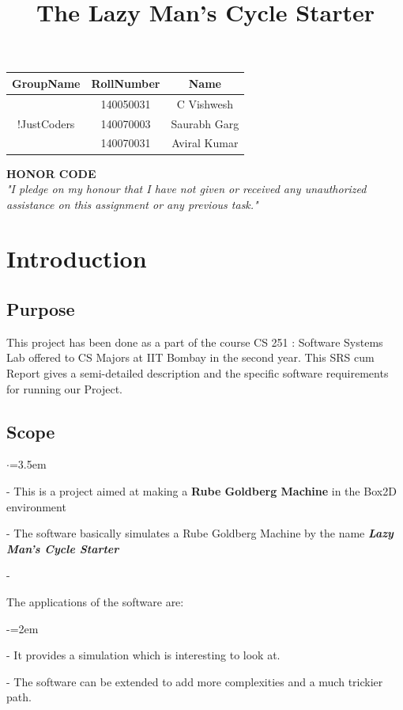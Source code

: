 \documentclass[12pt, a4paper]{article}
\begin{document}
\title{\color{red} The Lazy Man's Cycle Starter}
\maketitle

\begin{table}[ph]
\large
\centering
\begin{tabular}{c c c}
\hline
GroupName &RollNumber &Name\\
\hline 
\multirow{3}{*}{!JustCoders} &140050031 &C Vishwesh\\ &140070003 &Saurabh Garg\\&140070031 &Aviral Kumar\\
\hline
\end{tabular}
\end{table}

\newpage
\vspace*{\fill}
\begin{center}
{\textbf{HONOR CODE}}\\
\textit{"I pledge on my honour that I have not given or received any unauthorized assistance on this assignment or any previous task."}\\
\end{center}
\vspace*{\fill}
\pagebreak

\section{Introduction}
\subsection{Purpose}
This project has been done as a part of the course CS 251 : Software Systems Lab offered to CS Majors at IIT Bombay in the second year. This SRS cum Report gives a semi-detailed description and the specific software requirements for running our Project.

\subsection{Scope}
\begin{list}{$\cdot$}{\leftmargin=3.5em}
\item[-] {This is a project aimed at making a \textbf{Rube Goldberg Machine} in the Box2D environment}
\item[-] {The software basically simulates a Rube Goldberg Machine by the name \textbf{\textit{Lazy Man's Cycle Starter}}}
\item[-] {
The applications of the software are: 
	\begin{list}{-}{\leftmargin=2em}
		\item[-] {It provides a simulation which is interesting to look at.}
		\item[-] {The software can be extended to add more complexities and a much trickier path.}
	
	\end{list}	  
}
\end{list} 
\end{document}
